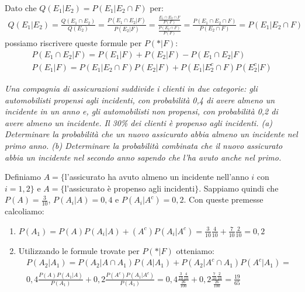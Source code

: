 Dato che $Q(E_1|E_2)=P(E_1|E_2\cap F)$ per:
\begin{align*}
    Q(E_1|E_2)=\frac{Q(E_1\cap E_2)}{Q(E_2)}=\frac{P(E_1\cap E_2|F)}{P(E_2|F)}=\frac{\frac{E_1\cap E_2\cap F}{P(F)}}{\frac{P(E_2\cap F)}{P(F)}}=\frac{P(E_1\cap E_2\cap F)}{P(E_2\cap F)}=P(E_1|E_2\cap F)
\end{align*}
possiamo riscrivere queste formule per $P(*|F)$:
\begin{gather*}
    P(E_1\cap E_2|F)=P(E_1|F)+P(E_2|F)-P(E_1\cap E_2|F)\\
    P(E_1|F) = P(E_1|E_2\cap F)P(E_2|F) + P(E_1|E_2^c\cap F)P(E_2^c|F)
\end{gather*}

\begin{Example}{}{}
    \textit{Una compagnia di assicurazioni suddivide i clienti in due categorie: gli automobilisti propensi agli incidenti, con probabilità 0,4 di avere almeno un incidente in un anno e, gli automobilisti non propensi, con probabilità 0,2 di avere almeno un incidente. Il 30\% dei clienti è propenso agli incidenti. (a) Determinare la probabilità che un nuovo assicurato abbia almeno un incidente nel primo anno. (b) Determinare la probabilità combinata che il nuovo assicurato abbia un incidente nel secondo anno sapendo che l'ha avuto anche nel primo.}

    Definiamo $A=\{$l'assicurato ha avuto almeno un incidente nell'anno $i$ con $i=1,2\}$ e $A=\{$l'assicurato è propenso agli incidenti$\}$. Sappiamo quindi che $P(A)=\frac{3}{10}$, $P(A_i|A)=0,4$ e $P(A_i|A^c)=0,2$. Con queste premesse calcoliamo:

    \begin{enumerate}[label=(\alph*)]
        \item $P(A_1)=P(A)P(A_i|A)+(A^c)P(A_i|A^c)=\frac{3}{10}\frac{4}{10}+\frac{7}{10}\frac{2}{10}=0,2$
        \item Utilizzando le formule trovate per $P(*|F)$ otteniamo:
        \begin{align*}
            P(A_2|A_1)=P(A_2|A\cap A_1)P(A|A_1)+P(A_2|A^c\cap A_1)P(A^c|A_1)=\\0,4\frac{P(A)P(A_1|A)}{P(A_1)}+0,2\frac{P(A^c)P(A_1|A^c)}{P(A_1)}=0,4\frac{\frac{3}{10}\frac{4}{10}}{\frac{26}{100}}+0,2\frac{\frac{7}{10}\frac{2}{10}}{\frac{26}{100}}=\frac{19}{65}
        \end{align*}
    \end{enumerate}
\end{Example}